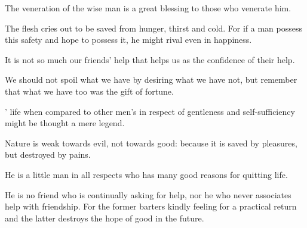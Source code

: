 \documentclass{stex}
\begin{document}
\vspace{0.5em}
\begin{sparagraph}[title=32]
  The veneration of the wise man is a great blessing to those who venerate him.
\end{sparagraph}

\vspace{0.5em}
\begin{sparagraph}[title=33]
  The flesh cries out to be saved from hunger, thirst and cold.
  For if a man possess this safety and hope to possess it, he might rival even  in happiness.
\end{sparagraph}

\vspace{0.5em}
\begin{sparagraph}[title=34]
  It is not so much our friends’ help that helps us as the confidence of their help.
\end{sparagraph}

\vspace{0.5em}
\begin{sparagraph}[title=35]
  We should not spoil what we have by desiring what we have not, but remember that what we have too was the gift of fortune.
\end{sparagraph}

\vspace{0.5em}
\begin{sparagraph}[title=36]
  ’ life when compared to other men’s in respect of gentleness and self-sufficiency might be thought a mere legend.
\end{sparagraph}

\vspace{0.5em}
\begin{sparagraph}[title=37]
  Nature is weak towards evil, not towards good: because it is saved by pleasures, but destroyed by pains.
\end{sparagraph}

\vspace{0.5em}
\begin{sparagraph}[title=38]
  He is a little man in all respects who has many good reasons for quitting life.
\end{sparagraph}

\vspace{0.5em}
\begin{sparagraph}[title=39]
  He is no friend who is continually asking for help, nor he who never associates help with friendship.
  For the former barters kindly feeling for a practical return and the latter destroys the hope of good in the future.
\end{sparagraph}
\end{document}
